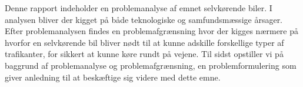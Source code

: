 Denne rapport indeholder en problemanalyse af emnet selvkørende biler. I analysen bliver der kigget på både teknologiske og samfundsmæssige årsager. Efter problemanalysen findes en problemafgrænsning hvor der kigges nærmere på hvorfor en selvkørende bil bliver nødt til at kunne adskille forskellige typer af trafikanter, for sikkert at kunne køre rundt på vejene. Til sidst opstiller vi på baggrund af problemanalyse og problemafgrænsning, en problemformulering som giver anledning til at beskæftige sig videre med dette emne.